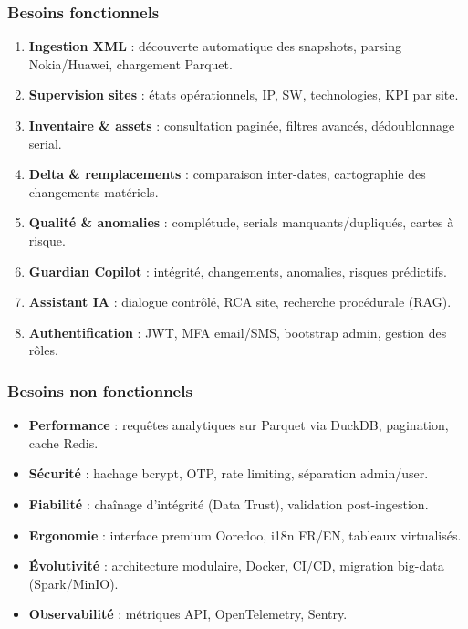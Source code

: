 \documentclass[12pt,a4paper]{report}
\begin{document}
\subsubsection{Besoins fonctionnels}
\begin{enumerate}[leftmargin=*,itemsep=3pt]
    \item \textbf{Ingestion XML} : découverte automatique des snapshots, parsing Nokia/Huawei, chargement Parquet.
    \item \textbf{Supervision sites} : états opérationnels, IP, SW, technologies, KPI par site.
    \item \textbf{Inventaire \& assets} : consultation paginée, filtres avancés, dédoublonnage serial.
    \item \textbf{Delta \& remplacements} : comparaison inter-dates, cartographie des changements matériels.
    \item \textbf{Qualité \& anomalies} : complétude, serials manquants/dupliqués, cartes à risque.
    \item \textbf{Guardian Copilot} : intégrité, changements, anomalies, risques prédictifs.
    \item \textbf{Assistant IA} : dialogue contrôlé, RCA site, recherche procédurale (RAG).
    \item \textbf{Authentification} : JWT, MFA email/SMS, bootstrap admin, gestion des rôles.
\end{enumerate}

\subsubsection{Besoins non fonctionnels}
\begin{itemize}[leftmargin=*,itemsep=2pt]
    \item \textbf{Performance} : requêtes analytiques sur Parquet via DuckDB, pagination, cache Redis.
    \item \textbf{Sécurité} : hachage bcrypt, OTP, rate limiting, séparation admin/user.
    \item \textbf{Fiabilité} : chaînage d'intégrité (Data Trust), validation post-ingestion.
    \item \textbf{Ergonomie} : interface premium Ooredoo, i18n FR/EN, tableaux virtualisés.
    \item \textbf{Évolutivité} : architecture modulaire, Docker, CI/CD, migration big-data (Spark/MinIO).
    \item \textbf{Observabilité} : métriques API, OpenTelemetry, Sentry.
\end{itemize}
\end{document}
